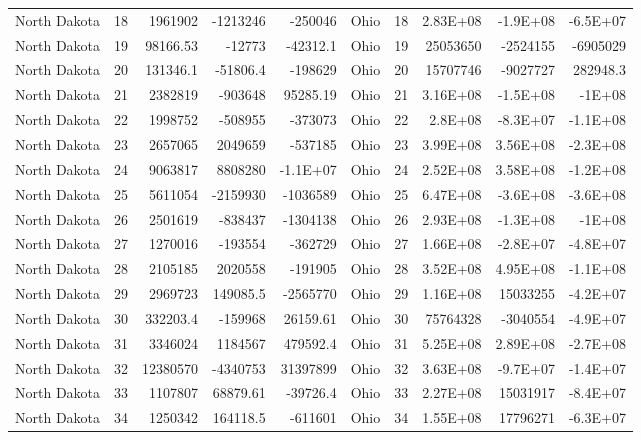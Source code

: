 \begin{table}[]
\begin{tabular}{lrrrrlrrrr}
		North Dakota &  18 & 1961902 & -1213246 & -250046 & Ohio &  18 & 2.83E+08 & -1.9E+08 & -6.5E+07 \\
		North Dakota &  19 & 98166.53 & -12773 & -42312.1 & Ohio &  19 & 25053650 & -2524155 & -6905029 \\
		North Dakota &  20 & 131346.1 & -51806.4 & -198629 & Ohio &  20 & 15707746 & -9027727 & 282948.3 \\
		North Dakota &  21 & 2382819 & -903648 & 95285.19 & Ohio &  21 & 3.16E+08 & -1.5E+08 & -1E+08 \\
		North Dakota &  22 & 1998752 & -508955 & -373073 & Ohio &  22 & 2.8E+08 & -8.3E+07 & -1.1E+08 \\
		North Dakota &  23 & 2657065 & 2049659 & -537185 & Ohio &  23 & 3.99E+08 & 3.56E+08 & -2.3E+08 \\
		North Dakota &  24 & 9063817 & 8808280 & -1.1E+07 & Ohio &  24 & 2.52E+08 & 3.58E+08 & -1.2E+08 \\
		North Dakota &  25 & 5611054 & -2159930 & -1036589 & Ohio &  25 & 6.47E+08 & -3.6E+08 & -3.6E+08 \\
		North Dakota &  26 & 2501619 & -838437 & -1304138 & Ohio &  26 & 2.93E+08 & -1.3E+08 & -1E+08 \\
		North Dakota &  27 & 1270016 & -193554 & -362729 & Ohio &  27 & 1.66E+08 & -2.8E+07 & -4.8E+07 \\
		North Dakota &  28 & 2105185 & 2020558 & -191905 & Ohio &  28 & 3.52E+08 & 4.95E+08 & -1.1E+08 \\
		North Dakota &  29 & 2969723 & 149085.5 & -2565770 & Ohio &  29 & 1.16E+08 & 15033255 & -4.2E+07 \\
		North Dakota &  30 & 332203.4 & -159968 & 26159.61 & Ohio &  30 & 75764328 & -3040554 & -4.9E+07 \\
		North Dakota &  31 & 3346024 & 1184567 & 479592.4 & Ohio &  31 & 5.25E+08 & 2.89E+08 & -2.7E+08 \\
		North Dakota &  32 & 12380570 & -4340753 & 31397899 & Ohio &  32 & 3.63E+08 & -9.7E+07 & -1.4E+07 \\
		North Dakota &  33 & 1107807 & 68879.61 & -39726.4 & Ohio &  33 & 2.27E+08 & 15031917 & -8.4E+07 \\
		North Dakota &  34 & 1250342 & 164118.5 & -611601 & Ohio &  34 & 1.55E+08 & 17796271 & -6.3E+07
	\end{tabular}
\end{table}

